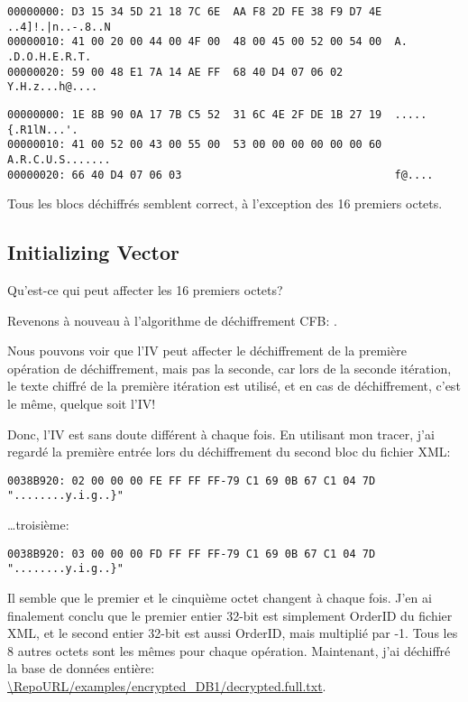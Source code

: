 \begin{lstlisting}
00000000: D3 15 34 5D 21 18 7C 6E  AA F8 2D FE 38 F9 D7 4E  ..4]!.|n..-.8..N
00000010: 41 00 20 00 44 00 4F 00  48 00 45 00 52 00 54 00  A. .D.O.H.E.R.T.
00000020: 59 00 48 E1 7A 14 AE FF  68 40 D4 07 06 02        Y.H.z...h@....
\end{lstlisting}

\begin{lstlisting}
00000000: 1E 8B 90 0A 17 7B C5 52  31 6C 4E 2F DE 1B 27 19  .....{.R1lN...'.
00000010: 41 00 52 00 43 00 55 00  53 00 00 00 00 00 00 60  A.R.C.U.S.......
00000020: 66 40 D4 07 06 03                                 f@....
\end{lstlisting}

Tous les blocs déchiffrés semblent correct, à l'exception des 16 premiers octets.

\subsection{Initializing Vector}

Qu'est-ce qui peut affecter les 16 premiers octets?

Revenons à nouveau à l'algorithme de déchiffrement \ac{CFB}: .

Nous pouvons voir que l'\ac{IV} peut affecter le déchiffrement de la première opération
de déchiffrement, mais pas la seconde, car lors de la seconde itération, le texte
chiffré de la première itération est utilisé, et en cas de déchiffrement, c'est le
même, quelque soit l'\ac{IV}!

Donc, l'\ac{IV} est sans doute différent à chaque fois.
En utilisant mon tracer, j'ai regardé la première entrée lors du déchiffrement du
second bloc du fichier \ac{XML}:

\begin{lstlisting}
0038B920: 02 00 00 00 FE FF FF FF-79 C1 69 0B 67 C1 04 7D "........y.i.g..}"
\end{lstlisting}

\dots troisième:

\begin{lstlisting}
0038B920: 03 00 00 00 FD FF FF FF-79 C1 69 0B 67 C1 04 7D "........y.i.g..}"
\end{lstlisting}

Il semble que le premier et le cinquième octet changent à chaque fois.
J'en ai finalement conclu que le premier entier 32-bit est simplement OrderID du fichier
\ac{XML}, et le second entier 32-bit est aussi OrderID, mais multiplié par -1. Tous
les 8 autres octets sont les mêmes pour chaque opération.
Maintenant, j'ai déchiffré la base de données entière:
\url{\RepoURL/examples/encrypted_DB1/decrypted.full.txt}.

